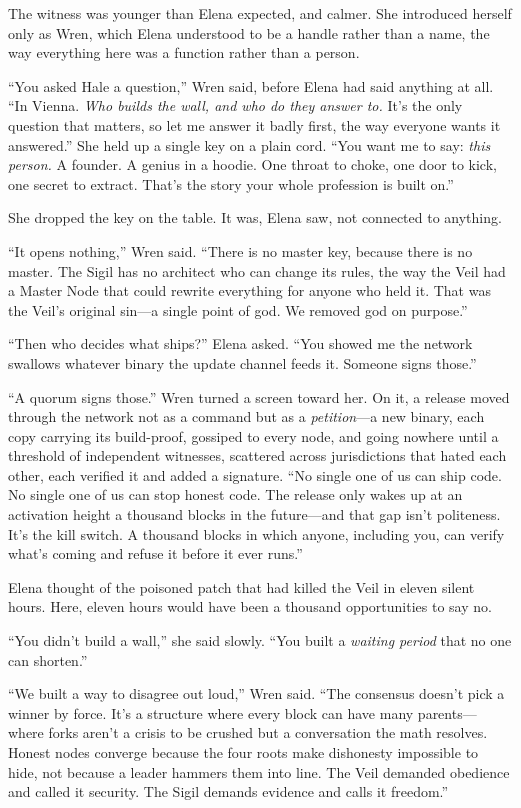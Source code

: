 \documentclass[12pt,letterpaper]{book}
\begin{document}
The witness was younger than Elena expected, and calmer. She introduced herself
only as Wren, which Elena understood to be a handle rather than a name, the way
everything here was a function rather than a person.

``You asked Hale a question,'' Wren said, before Elena had said anything at
all. ``In Vienna. \emph{Who builds the wall, and who do they answer to.} It's
the only question that matters, so let me answer it badly first, the way
everyone wants it answered.'' She held up a single key on a plain cord. ``You
want me to say: \emph{this person.} A founder. A genius in a hoodie. One throat
to choke, one door to kick, one secret to extract. That's the story your whole
profession is built on.''

She dropped the key on the table. It was, Elena saw, not connected to anything.

``It opens nothing,'' Wren said. ``There is no master key, because there is no
master. The Sigil has no architect who can change its rules, the way the Veil
had a Master Node that could rewrite everything for anyone who held it. That
was the Veil's original sin---a single point of god. We removed god on
purpose.''

``Then who decides what ships?'' Elena asked. ``You showed me the network
swallows whatever binary the update channel feeds it. Someone signs those.''

``A quorum signs those.'' Wren turned a screen toward her. On it, a release
moved through the network not as a command but as a \emph{petition}---a new
binary, each copy carrying its build-proof, gossiped to every node, and going
nowhere until a threshold of independent witnesses, scattered across
jurisdictions that hated each other, each verified it and added a signature.
``No single one of us can ship code. No single one of us can stop honest code.
The release only wakes up at an activation height a thousand blocks in the
future---and that gap isn't politeness. It's the kill switch. A thousand blocks
in which anyone, including you, can verify what's coming and refuse it before
it ever runs.''

Elena thought of the poisoned patch that had killed the Veil in eleven silent
hours. Here, eleven hours would have been a thousand opportunities to say no.

``You didn't build a wall,'' she said slowly. ``You built a \emph{waiting
period} that no one can shorten.''

``We built a way to disagree out loud,'' Wren said. ``The consensus doesn't
pick a winner by force. It's a structure where every block can have many
parents---where forks aren't a crisis to be crushed but a conversation the math
resolves. Honest nodes converge because the four roots make dishonesty
impossible to hide, not because a leader hammers them into line. The Veil
demanded obedience and called it security. The Sigil demands evidence and calls
it freedom.''
\end{document}

